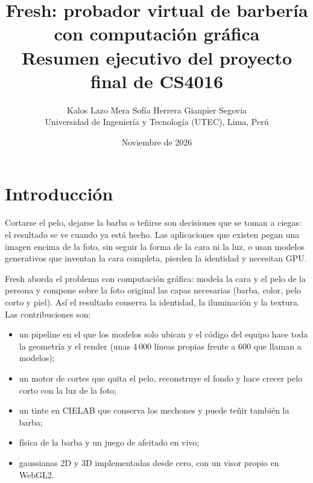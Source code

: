 \documentclass[10pt,a4paper,twocolumn]{article}
\title{\textbf{Fresh: probador virtual de barbería\\con computación gráfica}\\[0.3em]
\normalsize Resumen ejecutivo del proyecto final de CS4016}
\author{Kalos Lazo Mera \qquad Sofía Herrera \qquad Gianpier Segovia\\
\small Universidad de Ingeniería y Tecnología (UTEC), Lima, Perú}
\date{Noviembre de 2026}
\begin{document}

\section{Introducción}

Cortarse el pelo, dejarse la barba o teñirse son decisiones que se toman a ciegas: el resultado se ve cuando ya está hecho. Las aplicaciones que existen pegan una imagen encima de la foto, sin seguir la forma de la cara ni la luz, o usan modelos generativos que inventan la cara completa, pierden la identidad y necesitan GPU.

Fresh aborda el problema con computación gráfica: modela la cara y el pelo de la persona y compone sobre la foto original las capas necesarias (barba, color, pelo corto y piel). Así el resultado conserva la identidad, la iluminación y la textura. Las contribuciones son:
\begin{itemize}
  \item un pipeline en el que los modelos solo ubican y el código del equipo hace toda la geometría y el render (unas 4\,000 líneas propias frente a 600 que llaman a modelos);
  \item un motor de cortes que quita el pelo, reconstruye el fondo y hace crecer pelo corto con la luz de la foto;
  \item un tinte en CIELAB que conserva los mechones y puede teñir también la barba;
  \item física de la barba y un juego de afeitado en vivo;
  \item gaussianas 2D y 3D implementadas desde cero, con un visor propio en WebGL2.
\end{itemize}
\end{document}
